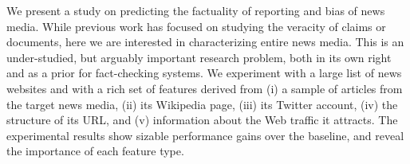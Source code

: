 We present a study on predicting the factuality of reporting and bias of news media. While previous work has focused on studying the veracity of claims or documents, here we are interested in characterizing entire news media. This is an under-studied, but arguably important research problem, both in its own right and as a prior for fact-checking systems. We experiment with a large list of news websites and with a rich set of features derived from (i) a sample of articles from the target news media, (ii) its Wikipedia page, (iii) its Twitter account, (iv) the structure of its URL, and (v) information about the Web traffic it attracts. The experimental results show sizable performance gains over the baseline, and reveal the importance of each feature type.

